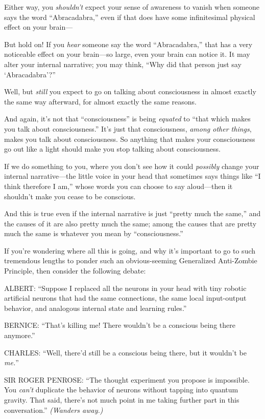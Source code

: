{
 Either way, you \textit{shouldn't} expect your
sense of awareness to vanish when someone says the word
``Abracadabra,'' even if that does
have some infinitesimal physical effect on your brain---}

{
 But hold on! If you \textit{hear} someone say the word
``Abracadabra,'' that has a very
noticeable effect on your brain---so large, even your brain can notice
it. It may alter your internal narrative; you may think,
``Why did that person just say
`Abracadabra'?''}

{
 Well, but \textit{still} you expect to go on talking about
consciousness in almost exactly the same way afterward, for almost
exactly the same reasons.}

{
 And again, it's not that
``consciousness'' is being
\textit{equated} to ``that which makes you talk about
consciousness.'' It's just that
consciousness, \textit{among other things}, makes you talk about
consciousness. So anything that makes your consciousness go out like a
light should make you stop talking about consciousness.}

{
 If we do something to you, where you don't see how
it could \textit{possibly} change your internal narrative---the little
voice in your head that sometimes says things like ``I
think therefore I am,'' whose words you can choose to
say aloud---then it shouldn't make you cease to be
conscious.}

{
 And this is true even if the internal narrative is just
``pretty much the same,'' and the
causes of it are also pretty much the same; among the causes that are
pretty much the same is whatever you mean by
``consciousness.''}

{
 If you're wondering where all this is going, and
why it's important to go to such tremendous lengths to
ponder such an obvious-seeming Generalized Anti-Zombie Principle, then
consider the following debate:}

{
 ALBERT: ``Suppose I replaced all the neurons in
your head with tiny robotic artificial neurons that had the same
connections, the same local input-output behavior, and analogous
internal state and learning rules.''}

{
 BERNICE: ``That's killing me!
There wouldn't be a conscious being there
anymore.''}

{
 CHARLES: ``Well, there'd still be
a conscious being there, but it wouldn't be
\textit{me.}''}

{
 SIR ROGER PENROSE: ``The thought experiment you
propose is impossible. You \textit{can't} duplicate the
behavior of neurons without tapping into quantum gravity. That said,
there's not much point in me taking further part in
this conversation.'' \textit{(Wanders away.)}}

